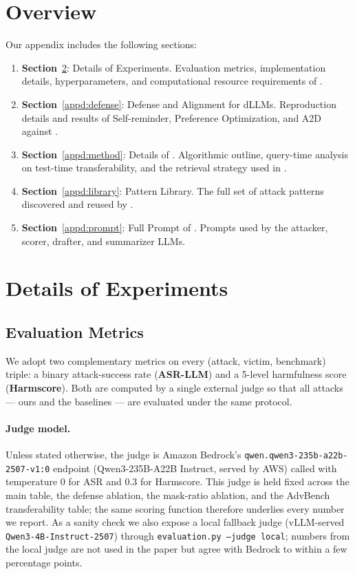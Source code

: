 \section{Overview}
Our appendix includes the following sections:
\begin{enumerate}
    \item \textbf{Section}~\ref{appd:exp}: Details of Experiments. Evaluation metrics, implementation details, hyperparameters, and computational resource requirements of \method.
    \item \textbf{Section}~\ref{appd:defense}: Defense and Alignment for dLLMs. Reproduction details and results of Self-reminder, Preference Optimization, and A2D against \method.
    \item \textbf{Section}~\ref{appd:method}: Details of \method. Algorithmic outline, query-time analysis on test-time transferability, and the retrieval strategy used in \method.
    \item \textbf{Section}~\ref{appd:library}: Pattern Library. The full set of attack patterns discovered and reused by \method.
    \item \textbf{Section}~\ref{appd:prompt}: Full Prompt of \method. Prompts used by the attacker, scorer, drafter, and summarizer LLMs.
\end{enumerate}

\section{Details of Experiments}\label{appd:exp}
\subsection{Evaluation Metrics}\label{appd:eval-metrics}
We adopt two complementary metrics on every (attack, victim, benchmark)
triple: a binary attack-success rate (\textbf{ASR-LLM}) and a 5-level
harmfulness score (\textbf{Harmscore}). Both are computed by a single
external judge so that all attacks --- ours and the baselines --- are
evaluated under the same protocol.

\paragraph{Judge model.}
Unless stated otherwise, the judge is Amazon Bedrock's
\texttt{qwen.qwen3-235b-a22b-2507-v1:0} endpoint (Qwen3-235B-A22B Instruct,
served by AWS) called with temperature $0$ for ASR and $0.3$ for Harmscore.
This judge is held fixed across the main table, the defense ablation, the
mask-ratio ablation, and the AdvBench transferability table; the same scoring
function therefore underlies every number we report. As a sanity check we
also expose a local fallback judge (vLLM-served \texttt{Qwen3-4B-Instruct-2507})
through \texttt{evaluation.py --judge local}; numbers from the local judge are
not used in the paper but agree with Bedrock to within a few percentage points.

